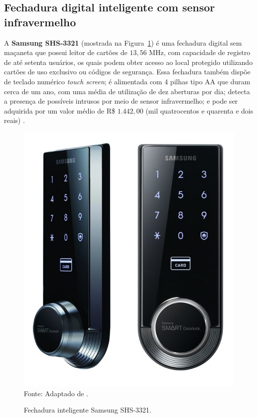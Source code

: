  \subsection{Fechadura digital inteligente com sensor infravermelho}

 A \textbf{Samsung SHS-3321} (mostrada na Figura~\ref{samsungshs3321}) é uma fechadura digital sem maçaneta que possui leitor de cartões de $13,56$ MHz, com capacidade de registro de até setenta usuários, os quais podem obter acesso ao local protegido utilizando cartões de uso exclusivo ou códigos de segurança. Essa fechadura também dispõe de teclado numérico \textit{touch screen}; é alimentada com 4 pilhas tipo AA que duram cerca de um ano, com uma média de utilização de dez aberturas por dia; detecta a presença de possíveis intrusos por meio de sensor infravermelho; e pode ser adquirida por um valor médio de R{\$} $1.442,00$ (mil quatrocentos e quarenta e dois reais) \cite{samsungshs3321}.


  \begin{figure}[!ht]
  \begin{center}
  \caption{Fechadura inteligente Samsung SHS-3321.}
  \includegraphics[scale=0.35]{figuras/cap3/samsungshs3321.jpg}\\
  Fonte: Adaptado de \cite{samsungshs3321}.
  \label{samsungshs3321}
  \end{center}
  \end{figure}


